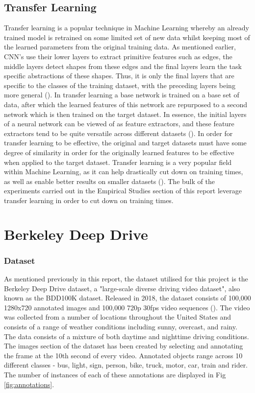 \documentclass[12pt]{report}
\begin{document}
\subsection{Transfer Learning}
\begin{flushleft}
Transfer learning is a popular technique in Machine Learning whereby an already trained model is retrained on some limited set of new data whilst keeping most of the learned parameters from the original training data. As mentioned earlier, CNN's use their lower layers to extract primitive features such as edges, the middle layers detect shapes from these edges and the final layers learn the task specific abstractions of these shapes. Thus, it is only the final layers that are specific to the classes of the training dataset, with the preceding layers being more general (\cite{yosinski2014transferable}). In transfer learning a base network is trained on a base set of data, after which the learned features of this network are repurposed to a second network which is then trained on the target dataset. In essence, the initial layers of a neural network can be viewed of as feature extractors, and these feature extractors tend to be quite versatile across different datasets (\cite{tan2018survey}). In order for transfer learning to be effective, the original and target datasets must have some degree of similarity in order for the originally learned features to be effective when applied to the target dataset. Transfer learning is a very popular field within Machine Learning, as it can help drastically cut down on training times, as well as enable better results on smaller datasets (\cite{tan2018survey}). The bulk of the experiments carried out in the Empirical Studies section of this report leverage transfer learning in order to cut down on training times.
\end{flushleft}

\section{Berkeley Deep Drive}
\subsubsection{Dataset}
\begin{flushleft}
As mentioned previously in this report, the dataset utilised for this project is the Berkeley Deep Drive dataset, a "large-scale diverse driving video dataset", also known as the BDD100K dataset. Released in 2018, the dataset consists of 100,000 1280x720 annotated images and 100,000 720p 30fps video sequences (\cite{yu2018bdd100k}). The video was collected from a number of locations throughout the United States and consists of a range of weather conditions including sunny, overcast, and rainy. The data consists of a mixture of both daytime and nighttime driving conditions. The images section of the dataset has been created by selecting and annotating the frame at the 10th second of every video. Annotated objects range across 10 different classes - bus, light, sign, person, bike, truck, motor, car, train and rider. The number of instances of each of these annotations are displayed in Fig \ref{fig:annotations}.
\end{flushleft}
\end{document}
